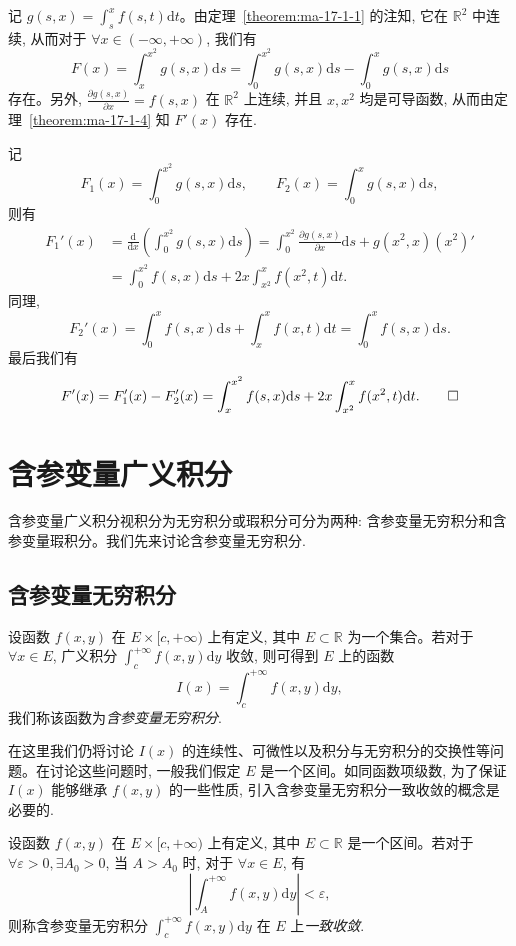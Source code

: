 \begin{solve}
记 $g(s,x)=\int_s^x f(s,t)\mathrm dt$。由定理~\ref{theorem:ma-17-1-1} 的注知, 它在 $\mathbb R^2$ 中连续, 从而对于 $\forall x\in(-\infty,+\infty)$, 我们有
\[
  F(x)=\int_x^{x^2}g(s,x)\mathrm ds
  =\int_0^{x^2}g(s,x)\mathrm ds-\int_0^x g(s,x)\mathrm ds
\]
存在。另外, $\frac{\partial g(s,x)}{\partial x}=f(s,x)$ 在 $\mathbb R^2$ 上连续, 并且 $x,x^2$ 均是可导函数, 从而由定理~\ref{theorem:ma-17-1-4} 知 $F'(x)$ 存在.

记
\[
  F_1(x)=\int_0^{x^2}g(s,x)\mathrm ds,\qquad
  F_2(x)=\int_0^x g(s,x)\mathrm ds,
\]
则有
\[
\begin{aligned}
  F_1'(x)
  &=\frac{\mathrm d}{\mathrm dx}\left(\int_0^{x^2}g(s,x)\mathrm ds\right)
    =\int_0^{x^2}\frac{\partial g(s,x)}{\partial x}\mathrm ds
      +g(x^2,x)(x^2)'\\
  &=\int_0^{x^2}f(s,x)\mathrm ds
    +2x\int_{x^2}^x f(x^2,t)\mathrm dt.
\end{aligned}
\]
同理,
\[
  F_2'(x)=\int_0^x f(s,x)\mathrm ds+\int_x^x f(x,t)\mathrm dt
  =\int_0^x f(s,x)\mathrm ds.
\]
最后我们有
\[
  F'(x)=F_1'(x)-F_2'(x)
  =\int_x^{x^2}f(s,x)\mathrm ds+2x\int_{x^2}^x f(x^2,t)\mathrm dt.
\qedhere
\]
\end{solve}


\section{含参变量广义积分}
\label{sec:ma-17-2}

含参变量广义积分视积分为无穷积分或瑕积分可分为两种: 含参变量无穷积分和含参变量瑕积分。我们先来讨论含参变量无穷积分.

\subsection{含参变量无穷积分}
\label{subsec:ma-17-2-1}

设函数 $f(x,y)$ 在 $E\times[c,+\infty)$ 上有定义, 其中 $E\subset\mathbb R$ 为一个集合。若对于 $\forall x\in E$, 广义积分 $\int_c^{+\infty}f(x,y)\mathrm dy$ 收敛, 则可得到 $E$ 上的函数
\[
  I(x)=\int_c^{+\infty}f(x,y)\mathrm dy,
\]
我们称该函数为\emph{含参变量无穷积分}.

在这里我们仍将讨论 $I(x)$ 的连续性、可微性以及积分与无穷积分的交换性等问题。在讨论这些问题时, 一般我们假定 $E$ 是一个区间。如同函数项级数, 为了保证 $I(x)$ 能够继承 $f(x,y)$ 的一些性质, 引入含参变量无穷积分一致收敛的概念是必要的.

\begin{definition}\label{definition:ma-17-2-1}
设函数 $f(x,y)$ 在 $E\times[c,+\infty)$ 上有定义, 其中 $E\subset\mathbb R$ 是一个区间。若对于 $\forall\varepsilon>0,\exists A_0>0$, 当 $A>A_0$ 时, 对于 $\forall x\in E$, 有
\[
  \left|\int_A^{+\infty}f(x,y)\mathrm dy\right|<\varepsilon,
\]
则称含参变量无穷积分 $\int_c^{+\infty}f(x,y)\mathrm dy$ 在 $E$ 上\emph{一致收敛}.
\end{definition}

